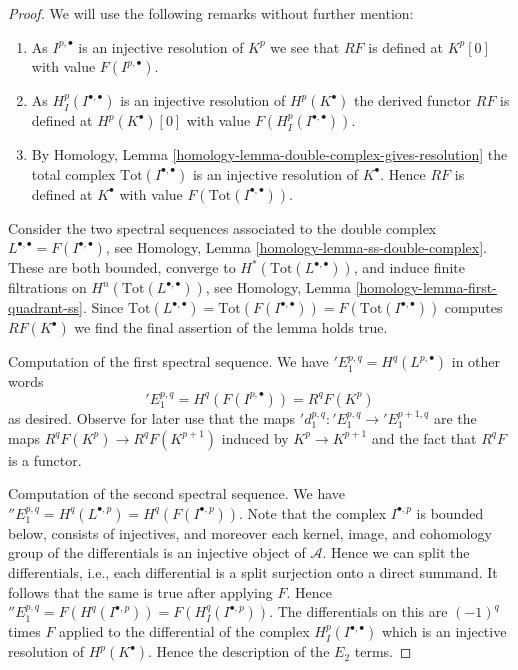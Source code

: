 \begin{proof}
We will use the following remarks without further mention:
\begin{enumerate}
\item As $I^{p, \bullet}$ is an injective resolution of
$K^p$ we see that $RF$ is defined at $K^p[0]$
with value $F(I^{p, \bullet})$.
\item As $H^p_I(I^{\bullet, \bullet})$ is an injective resolution of
$H^p(K^\bullet)$ the derived functor $RF$ is defined at $H^p(K^\bullet)[0]$
with value $F(H^p_I(I^{\bullet, \bullet}))$.
\item By
Homology, Lemma \ref{homology-lemma-double-complex-gives-resolution}
the total complex $\text{Tot}(I^{\bullet, \bullet})$
is an injective resolution of
$K^\bullet$. Hence $RF$ is defined at $K^\bullet$ with value
$F(\text{Tot}(I^{\bullet, \bullet}))$.
\end{enumerate}
Consider the two spectral sequences associated to the double complex
$L^{\bullet, \bullet} = F(I^{\bullet, \bullet})$, see
Homology, Lemma \ref{homology-lemma-ss-double-complex}.
These are both bounded, converge to $H^*(\text{Tot}(L^{\bullet, \bullet}))$,
and induce finite filtrations on $H^n(\text{Tot}(L^{\bullet, \bullet}))$, see
Homology, Lemma \ref{homology-lemma-first-quadrant-ss}.
Since
$\text{Tot}(L^{\bullet, \bullet}) =
\text{Tot}(F(I^{\bullet, \bullet})) =
F(\text{Tot}(I^{\bullet, \bullet}))$ computes
$RF(K^\bullet)$ we find the final assertion of the lemma holds true.

\medskip\noindent
Computation of the first spectral sequence. We have
${}'E_1^{p, q} = H^q(L^{p, \bullet})$ in other words
$$
{}'E_1^{p, q} = H^q(F(I^{p, \bullet})) = R^qF(K^p)
$$
as desired. Observe for later use that the maps
${}'d_1^{p, q} : {}'E_1^{p, q} \to {}'E_1^{p + 1, q}$ are the maps
$R^qF(K^p) \to R^qF(K^{p + 1})$ induced by $K^p \to K^{p + 1}$
and the fact that $R^qF$ is a functor.

\medskip\noindent
Computation of the second spectral sequence. We have
${}''E_1^{p, q} = H^q(L^{\bullet, p}) = H^q(F(I^{\bullet, p}))$.
Note that the complex $I^{\bullet, p}$ is bounded below,
consists of injectives, and moreover each kernel, image, and
cohomology group of the differentials is an injective object
of $\mathcal{A}$. Hence we can split the differentials, i.e.,
each differential is a split surjection onto a direct summand.
It follows that the same is true after applying $F$. Hence
${}''E_1^{p, q} = F(H^q(I^{\bullet, p})) = F(H^q_I(I^{\bullet, p}))$.
The differentials on this are $(-1)^q$ times $F$ applied to
the differential of the complex $H^p_I(I^{\bullet, \bullet})$
which is an injective resolution of $H^p(K^\bullet)$. Hence the
description of the $E_2$ terms.
\end{proof}


